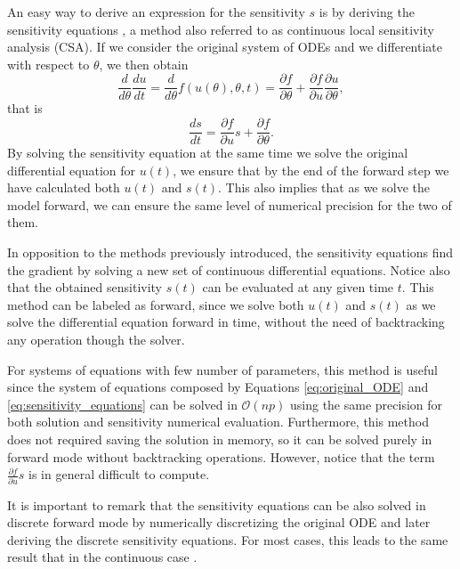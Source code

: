An easy way to derive an expression for the sensitivity $s$ is by deriving the sensitivity equations \cite{ramsay2017dynamic}, a method also referred to as continuous local sensitivity analysis (CSA). 
If we consider the original system of ODEs and we differentiate with respect to $\theta$, we then obtain
\begin{equation}
 \frac{d}{d\theta} \frac{du}{dt} 
 =
 \frac{d}{d\theta} f(u(\theta), \theta, t)
 = 
 \frac{\partial f}{\partial \theta}
 + 
 \frac{\partial f}{\partial u} \frac{\partial u}{\partial \theta},
\end{equation}
that is
\begin{equation}
 \frac{ds}{dt} = \frac{\partial f}{\partial u} s + \frac{\partial f}{\partial \theta}.
 \label{eq:sensitivity_equations}
\end{equation}
By solving the sensitivity equation at the same time we solve the original differential equation for $u(t)$, we ensure that by the end of the forward step we have calculated both $u(t)$ and $s(t)$. 
This also implies that as we solve the model forward, we can ensure the same level of numerical precision for the two of them.

In opposition to the methods previously introduced, the sensitivity equations find the gradient by solving a new set of continuous differential equations.
Notice also that the obtained sensitivity $s(t)$ can be evaluated at any given time $t$. This method can be labeled as forward, since we solve both $u(t)$ and $s(t)$ as we solve the differential equation forward in time, without the need of backtracking any operation though the solver.

For systems of equations with few number of parameters, this method is useful since the system of equations composed by Equations \eqref{eq:original_ODE} and \eqref{eq:sensitivity_equations} can be solved in $\mathcal O (np)$ using the same precision for both solution and sensitivity numerical evaluation. 
Furthermore, this method does not required saving the solution in memory, so it can be solved purely in forward mode without backtracking operations.
However, notice that the term $\frac{\partial f}{\partial u} s $ is in general difficult to compute. 

It is important to remark that the sensitivity equations can be also solved in discrete forward mode by numerically discretizing the original ODE and later deriving the discrete sensitivity equations. 
For most cases, this leads to the same result that in the continuous case \cite{FATODE2014}.

